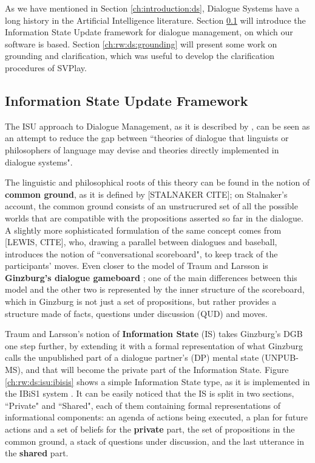 As we have mentioned in Section \ref{ch:introduction:ds}, Dialogue Systems have a long history in the Artificial Intelligence literature. Section \ref{ch:rw:ds:isu} will introduce the Information State Update framework for dialogue management, on which our software is based. Section \ref{ch:rw:ds:grounding} will present some work on grounding and clarification, which was useful to develop the clarification procedures of SVPlay.

\subsection{Information State Update Framework}\label{ch:rw:ds:isu}
The ISU approach to Dialogue Management, as it is described by \cite{TraumLarsson03p325}, can be seen as an attempt to reduce the gap between ``theories of dialogue that linguists or philosophers of language may devise and theories directly implemented in dialogue systems".

The linguistic and philosophical roots of this theory can be found in the notion of \textbf{common ground}, as it is defined by [STALNAKER CITE]; on Stalnaker's account, the common ground consists of an unstrucrured set of all the possible worlds that are compatible with the propositions asserted so far in the dialogue. A slightly more sophisticated formulation of the same concept comes from [LEWIS, CITE], who, drawing a parallel between dialogues and baseball, introduces the notion of ``conversational scoreboard", to keep track of the participants' moves. Even closer to the model of Traum and Larsson is \textbf{Ginzburg's dialogue gameboard} \citep{LLBook59315}; one of the main differences between this model and the other two is represented by the inner structure of the scoreboard, which in Ginzburg is not just a set of propositions, but rather provides a structure made of facts, questions under discussion (QUD) and moves.

Traum and Larsson's notion of \textbf{Information State} (IS) takes Ginzburg's DGB one step further, by extending it with a formal representation of what Ginzburg calls the unpublished part of a dialogue partner's (DP) mental state (UNPUB-MS), and that will become the private part of the Information State. Figure \ref{ch:rw:ds:isu:ibisis} shows a simple Information State type, as it is implemented in the IBiS1 system \citep[p. 36]{Larsson02issue-baseddialogue}. It can be easily noticed that the IS is split in two sections, ``Private" and ``Shared", each of them containing formal representations of informational components: an agenda of actions being executed, a plan for future actions and a set of beliefs for the \textbf{private} part, the set of propositions in the common ground, a stack of questions under discussion, and the last utterance in the \textbf{shared} part.

